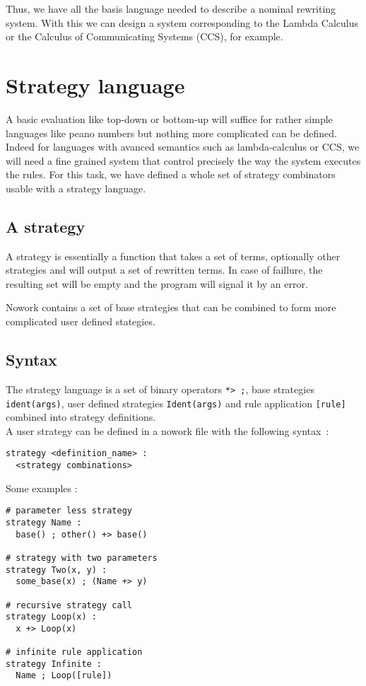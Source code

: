 \documentclass[12pt,a4paper]{article}
\begin{document}
Thus, we have all the basis language needed to describe a nominal
rewriting system. With this we can design a system
corresponding to the Lambda Calculus or the Calculus of Communicating
Systems (CCS), for example.

\section{Strategy language}

A basic evaluation like top-down or bottom-up will suffice for rather simple
languages like peano numbers but nothing more complicated can be defined.
Indeed for languages with avanced semantics such as lambda-calculus or CCS, we 
will need a fine grained system that control precisely the way the system 
executes the rules. For this task, we have defined a whole set of strategy 
combinators usable with a strategy language.

\subsection{A strategy}
A strategy is essentially a function that takes a set of terms, optionally other
strategies and will output a set of rewritten terms. In case of faillure, the 
resulting set will be empty and the program will signal it by an error.

Nowork contains a set of base strategies that can be combined to form more
complicated user defined stategies.

\subsection{Syntax}
The strategy language is a set of binary operators \verb|*> ;|, base strategies 
\verb|ident(args)|, user defined strategies \verb|Ident(args)| and rule 
application \verb|[rule]| combined into strategy definitions.\\

A user strategy can be defined in a nowork file with the following syntax~:
\begin{verbatim}
strategy <definition_name> : 
  <strategy combinations>
\end{verbatim}

Some examples : 

\begin{verbatim}
# parameter less strategy
strategy Name : 
  base() ; other() +> base()

# strategy with two parameters
strategy Two(x, y) :
  some_base(x) ; (Name +> y)

# recursive strategy call
strategy Loop(x) :
  x +> Loop(x)

# infinite rule application
strategy Infinite :
  Name ; Loop([rule])
\end{verbatim}
\end{document}
